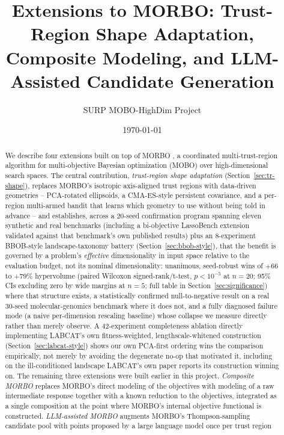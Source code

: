 \documentclass[11pt]{article}
\title{Extensions to MORBO: Trust-Region Shape Adaptation, \\
Composite Modeling, and LLM-Assisted Candidate Generation}
\author{SURP MOBO-HighDim Project}
\date{\today}
\begin{document}
\maketitle

\begin{abstract}
We describe four extensions built on top of MORBO
\citep{daulton2022morbo}, a coordinated multi-trust-region algorithm for
multi-objective Bayesian optimization (MOBO) over high-dimensional search
spaces. The central contribution, \emph{trust-region shape adaptation}
(Section~\ref{sec:tr-shape}), replaces MORBO's isotropic axis-aligned
trust regions with data-driven geometries -- PCA-rotated ellipsoids, a
CMA-ES-style persistent covariance, and a per-region multi-armed bandit
that learns which geometry to use without being told in advance -- and
establishes, across a 20-seed confirmation program spanning eleven
synthetic and real benchmarks (including a bi-objective LassoBench
extension validated against that benchmark's own published results) plus
an 8-experiment BBOB-style landscape-taxonomy battery
(Section~\ref{sec:bbob-style}), that the benefit is governed by a
problem's \emph{effective} dimensionality in input space relative to the
evaluation budget, not its nominal dimensionality: unanimous, seed-robust
wins of $+66$ to $+79\%$ hypervolume (paired Wilcoxon signed-rank/t-test,
$p < 10^{-5}$ at $n{=}20$; 95\% CIs excluding zero by wide margins at
$n{=}5$; full table in Section~\ref{sec:significance}) where that
structure exists, a statistically confirmed null-to-negative result on a
real 30-seed molecular-genomics benchmark where it does not, and a fully
diagnosed failure mode (a naive per-dimension rescaling baseline) whose
collapse we measure directly rather than merely observe. A 42-experiment
completeness ablation directly implementing LABCAT's own
fitness-weighted, lengthscale-whitened construction
(Section~\ref{sec:labcat-style}) shows our own PCA-first ordering wins the
comparison empirically, not merely by avoiding the degenerate no-op that
motivated it, including on the ill-conditioned landscape LABCAT's own
paper reports its construction winning on. The remaining three extensions were built earlier in this
project. \emph{Composite MORBO} replaces MORBO's direct modeling of the
objectives with modeling of a raw intermediate response together with a
known reduction to the objectives, integrated as a single composition at
the point where MORBO's internal objective functional is constructed.
\emph{LLM-assisted MORBO} augments MORBO's Thompson-sampling candidate
pool with points proposed by a large language model once per trust region

\end{abstract}
\end{document}
